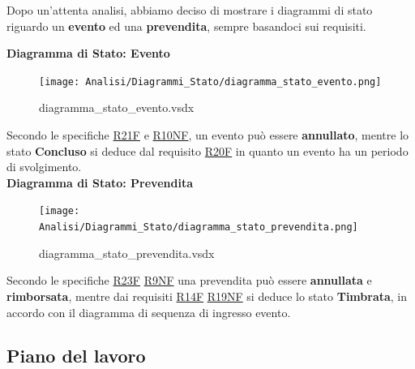 \documentclass[a4paper]{article}
\begin{document}
Dopo un'attenta analisi, abbiamo deciso di mostrare i diagrammi di stato riguardo un \textbf{evento} ed una \textbf{prevendita}, sempre basandoci sui requisiti.



\textbf{Diagramma di Stato: Evento}

\begin{figure}[H]
    \texttt{[image: Analisi/Diagrammi\_Stato/diagramma\_stato\_evento.png]}
    \centering
    \caption{diagramma\_stato\_evento.vsdx}
\end{figure}

Secondo le specifiche \hyperlink{R21F}{R21F} e \hyperlink{R10NF}{R10NF}, un evento può essere \textbf{annullato}, mentre lo stato \textbf{Concluso} si deduce dal requisito \hyperlink{R20F}{R20F} in quanto un evento ha un periodo di svolgimento.\\

\textbf{Diagramma di Stato: Prevendita}

\begin{figure}[H]
    \texttt{[image: Analisi/Diagrammi\_Stato/diagramma\_stato\_prevendita.png]}
    \centering
    \caption{diagramma\_stato\_prevendita.vsdx}
\end{figure}

Secondo le specifiche \hyperlink{R23F}{R23F} \hyperlink{R9NF}{R9NF} una prevendita può essere \textbf{annullata} e \textbf{rimborsata}, mentre dai requisiti \hyperlink{R14F}{R14F} \hyperlink{R19NF}{R19NF} si deduce lo stato \textbf{Timbrata}, in accordo con il diagramma di sequenza di ingresso evento.

\newpage

\subsection{Piano del lavoro}
\end{document}
